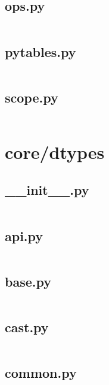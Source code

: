 \documentclass{article}
\begin{document}
\subsection{ops.py}
\inputminted{python}{/home/dufferzafar/dev/@clones/pandas/pandas/core/computation/ops.py}
\newpage

\subsection{pytables.py}
\inputminted{python}{/home/dufferzafar/dev/@clones/pandas/pandas/core/computation/pytables.py}
\newpage

\subsection{scope.py}
\inputminted{python}{/home/dufferzafar/dev/@clones/pandas/pandas/core/computation/scope.py}
\newpage

\section{core/dtypes}

\subsection{\_\_init\_\_.py}
\inputminted{python}{/home/dufferzafar/dev/@clones/pandas/pandas/core/dtypes/__init__.py}
\newpage

\subsection{api.py}
\inputminted{python}{/home/dufferzafar/dev/@clones/pandas/pandas/core/dtypes/api.py}
\newpage

\subsection{base.py}
\inputminted{python}{/home/dufferzafar/dev/@clones/pandas/pandas/core/dtypes/base.py}
\newpage

\subsection{cast.py}
\inputminted{python}{/home/dufferzafar/dev/@clones/pandas/pandas/core/dtypes/cast.py}
\newpage

\subsection{common.py}
\inputminted{python}{/home/dufferzafar/dev/@clones/pandas/pandas/core/dtypes/common.py}
\newpage
\end{document}
